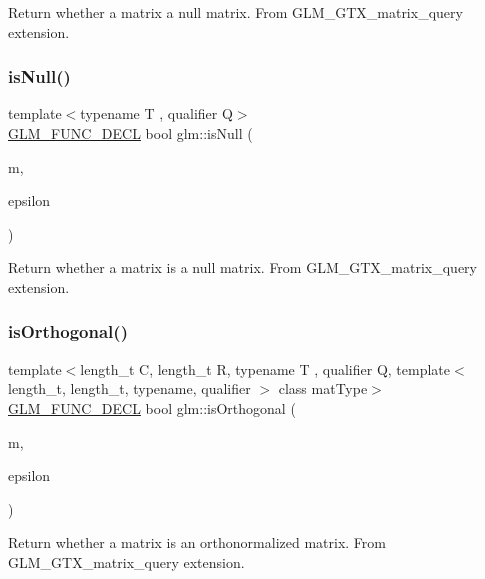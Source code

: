 Return whether a matrix a null matrix. From G\+L\+M\+\_\+\+G\+T\+X\+\_\+matrix\+\_\+query extension. \mbox{\label{group__gtx__matrix__query_ga2b98bb30a9fefa7cdea5f1dcddba677b}} 
\subsubsection{\texorpdfstring{is\+Null()}{isNull()}\hspace{0.1cm}{\footnotesize\ttfamily [3/3]}}
{\footnotesize\ttfamily template$<$typename T , qualifier Q$>$ \\
\hyperlink{setup_8hpp_ab2d052de21a70539923e9bcbf6e83a51}{G\+L\+M\+\_\+\+F\+U\+N\+C\+\_\+\+D\+E\+CL} bool glm\+::is\+Null (\begin{DoxyParamCaption}\item[{\hyperlink{structglm_1_1mat}{mat}$<$ 4, 4, T, Q $>$ const \&}]{m,  }\item[{T const \&}]{epsilon }\end{DoxyParamCaption})}

Return whether a matrix is a null matrix. From G\+L\+M\+\_\+\+G\+T\+X\+\_\+matrix\+\_\+query extension. \mbox{\label{group__gtx__matrix__query_ga58f3289f74dcab653387dd78ad93ca40}} 
\subsubsection{\texorpdfstring{is\+Orthogonal()}{isOrthogonal()}}
{\footnotesize\ttfamily template$<$length\+\_\+t C, length\+\_\+t R, typename T , qualifier Q, template$<$ length\+\_\+t, length\+\_\+t, typename, qualifier $>$ class mat\+Type$>$ \\
\hyperlink{setup_8hpp_ab2d052de21a70539923e9bcbf6e83a51}{G\+L\+M\+\_\+\+F\+U\+N\+C\+\_\+\+D\+E\+CL} bool glm\+::is\+Orthogonal (\begin{DoxyParamCaption}\item[{mat\+Type$<$ C, R, T, Q $>$ const \&}]{m,  }\item[{T const \&}]{epsilon }\end{DoxyParamCaption})}

Return whether a matrix is an orthonormalized matrix. From G\+L\+M\+\_\+\+G\+T\+X\+\_\+matrix\+\_\+query extension. 